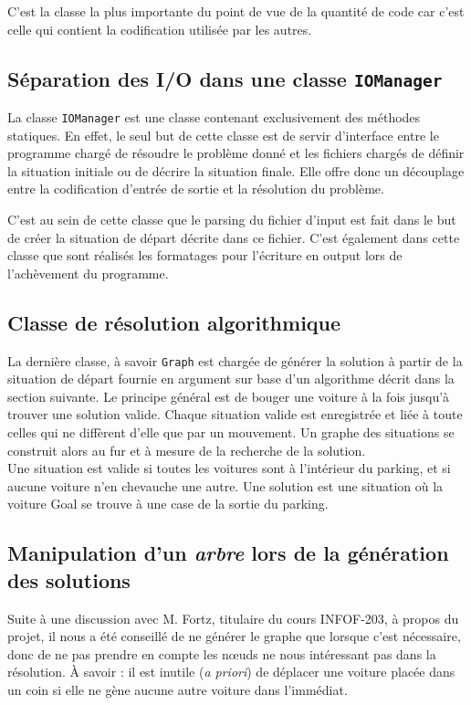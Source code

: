 \documentclass{article}
\begin{document}
        C'est la classe la plus importante du point de vue de la quantité de code car c'est celle qui contient la codification utilisée par les autres.

    \subsection{Séparation des I/O dans une classe \texttt{IOManager}}
        La classe \texttt{IOManager} est une classe contenant exclusivement des méthodes statiques. En effet, le seul but de cette classe
        est de servir d'interface entre le programme chargé de résoudre le problème donné et les fichiers chargés de définir la situation
        initiale ou de décrire la situation finale. Elle offre donc un découplage entre la codification d'entrée de sortie et la résolution
		du problème.

		C'est au sein de cette classe que le parsing du fichier d'input est fait dans le but de créer la situation de départ décrite dans ce fichier.
        C'est également dans cette classe que sont réalisés les formatages pour l'écriture en output lors de l'achèvement du programme.

    \subsection{Classe de résolution algorithmique}
        La dernière classe, à savoir \texttt{Graph} est chargée de générer la solution à partir de la situation de départ fournie en argument
        sur base d'un algorithme décrit dans la section suivante. Le principe général est de bouger une voiture à la fois jusqu'à trouver une
		solution valide. Chaque situation valide est enregistrée et liée à toute celles qui ne diffèrent d'elle que par un mouvement.
		Un graphe des situations se construit alors au fur et à mesure de la recherche de la solution.\\
		Une situation est valide si toutes les voitures sont à l'intérieur du parking, et si aucune voiture n'en chevauche une autre.
		Une solution est une situation où la voiture Goal se trouve à une case de la sortie du parking.

    \subsection{Manipulation d'un \textit{arbre} lors de la génération des solutions}
        Suite à une discussion avec M. Fortz, titulaire du cours INFOF-203, à propos du projet, il nous a été conseillé de ne générer le graphe
        que lorsque c'est nécessaire, donc de ne pas prendre en compte les nœuds ne nous intéressant pas dans la résolution. À savoir : il est
        inutile (\textit{a priori}) de déplacer une voiture placée dans un coin si elle ne gène aucune autre voiture dans l'immédiat.
\end{document}
